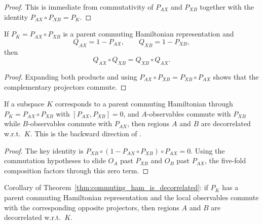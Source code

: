 \begin{proof}
    \leanok
    This is immediate from commutativity of $P_{AX}$ and $P_{XB}$ together
    with the identity $P_{AX} \circ P_{XB} = P_K$.
\end{proof}

\begin{theorem}%
    \label{thm:complement_comm}
    \leanok
    If $P_K = P_{AX} \circ P_{XB}$ is a parent commuting Hamiltonian
    representation and
    \[
        Q_{AX} = 1 - P_{AX}, \qquad Q_{XB} = 1 - P_{XB},
    \]
    then
    \[
        Q_{AX} \circ Q_{XB} = Q_{XB} \circ Q_{AX}.
    \]
\end{theorem}

\begin{proof}
    \leanok
    Expanding both products and using $P_{AX} \circ P_{XB}
        = P_{XB} \circ P_{AX}$ shows that the complementary projectors commute.
\end{proof}

\begin{theorem}%
    \label{thm:commuting_ham_is_decorrelated}
    \leanok
    If a subspace $K$ corresponds to a parent commuting Hamiltonian through
    $P_K = P_{AX} \circ P_{XB}$ with $[P_{AX}, P_{XB}] = 0$, and
    $A$-observables commute with $P_{XB}$ while $B$-observables commute
    with $P_{AX}$, then regions $A$ and $B$ are decorrelated w.r.t.\ $K$.
    This is the backward direction of
    \cite[Appendix~D, Section~D.2, Proposition~D.3]{Cirac2016MPDO_arXiv}.
\end{theorem}

\begin{proof}
    \leanok
    The key identity is $P_{XB} \circ (1 - P_{AX} \circ P_{XB}) \circ P_{AX} = 0$.
    Using the commutation hypotheses to slide $O_A$ past $P_{XB}$ and $O_B$
    past $P_{AX}$, the five-fold composition factors through this zero term.
\end{proof}

\begin{theorem}%
    \label{thm:has_commuting_parent_ham_is_decorrelated}
    \leanok
    Corollary of Theorem~\ref{thm:commuting_ham_is_decorrelated}: if
    $P_K$ has a parent commuting Hamiltonian representation and the local
    observables commute with the corresponding opposite projectors, then regions
    $A$ and $B$ are decorrelated w.r.t.\ $K$.
\end{theorem}

